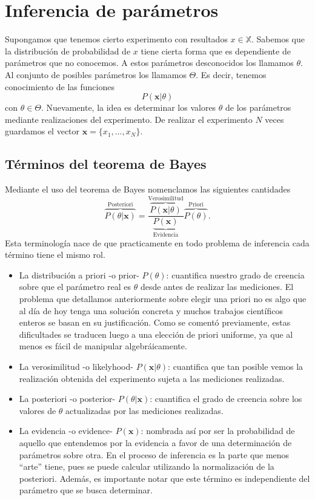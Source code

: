 \section{Inferencia de parámetros}
Supongamos que tenemos cierto experimento con resultados $x\in \mathbb{X}$. Sabemos que la distribución de probabilidad de $x$ tiene cierta forma que es dependiente de parámetros que no conocemos. A estos parámetros desconocidos los llamamos $\theta$. Al conjunto de posibles parámetros los llamamos $\Theta$. Es decir, tenemos conocimiento de las funciones
\begin{equation}
    P(\mathbf{x}|\theta)
\end{equation}
con $\theta \in \Theta$. Nuevamente, la idea es determinar los valores $\theta$ de los parámetros mediante realizaciones del experimento. De realizar el experimento $N$ veces guardamos el vector $\mathbf{x} = \{x_1,...,x_N\}$.

\subsection{Términos del teorema de Bayes}
Mediante el uso del teorema de Bayes nomenclamos las siguientes cantidades
\begin{equation}
    \overbrace{P(\theta|\mathbf{x})}^{\text{Posteriori}} = \frac{\overbrace{P(\mathbf{x}|\theta)}^{\text{Verosimilitud}}}{\underbrace{P(\mathbf{x})}_{\text{Evidencia}}} \overbrace{P(\theta)}^{\text{Priori}}.
\end{equation}
Esta terminología nace de que practicamente en todo problema de inferencia cada término tiene el mismo rol.
\begin{itemize}
    \item La distribución a priori -o prior- $P(\theta)$: cuantifica nuestro grado de creencia sobre que el parámetro real es $\theta$ desde antes de realizar las mediciones. El problema que detallamos anteriormente sobre elegir una priori no es algo que al día de hoy tenga una solución concreta y muchos trabajos científicos enteros se basan en su justificación. Como se comentó previamente, estas dificultades se traducen luego a una elección de priori uniforme, ya que al menos es fácil de manipular algebráicamente.
    \item La verosimilitud -o likelyhood- $P(\mathbf{x}|\theta)$: cuantifica que tan posible vemos la realización obtenida del experimento sujeta a las mediciones realizadas. 
    \item La posteriori -o posterior- $P(\theta|\mathbf{x})$: cuantifica el grado de creencia sobre los valores de $\theta$ actualizadas por las mediciones realizadas.
    \item La evidencia -o evidence- $P(\mathbf{x})$: nombrada así por ser la probabilidad de aquello que entendemos por la evidencia a favor de una determinación de parámetros sobre otra. En el proceso de inferencia es la parte que menos ``arte'' tiene, pues se puede calcular utilizando la normalización de la posteriori. Además, es importante notar que este término es independiente del parámetro que se busca determinar.
\end{itemize}


